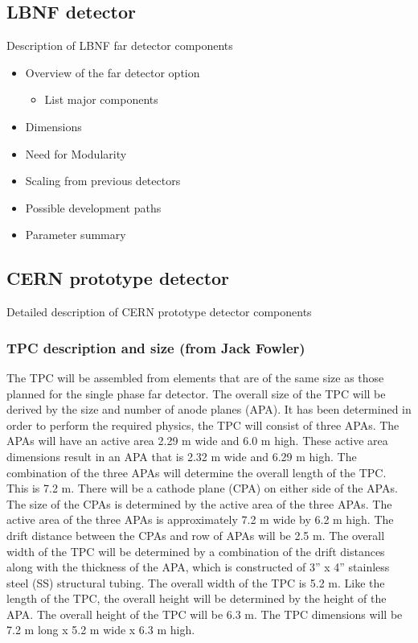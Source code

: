 \subsection{LBNF detector}
Description of LBNF far detector components
\begin{itemize}
\item Overview of the far detector option
\begin{itemize}
\item List major components
\end{itemize}
\item Dimensions
\item Need for Modularity
\item Scaling from previous detectors
\item Possible development paths
\item Parameter summary
\end{itemize}


\subsection{CERN prototype detector}
Detailed description of CERN prototype detector components
\subsubsection{TPC description and size (from Jack Fowler)}

The TPC will be assembled from elements that are of the same size as those planned for the single phase 
far detector.  The overall size of the TPC will be derived by the size and number of anode planes (APA).  It 
has been determined in order to perform the required physics, the TPC will consist of three APAs.  The 
APAs will have an active area 2.29 m wide and 6.0 m high.  These active area dimensions result in an APA 
that is 2.32 m wide and 6.29 m high.  The combination of the three APAs will determine the overall length 
of the TPC.  This is 7.2 m.  There will be a cathode plane (CPA) on either side of the APAs.  The size of the 
CPAs is determined by the active area of the three APAs.  The active area of the three APAs is 
approximately 7.2 m wide by 6.2 m high.  The drift distance between the CPAs and row of APAs will be 2.5 
m.  The overall width of the TPC will be determined by a combination of the drift distances along with the 
thickness of the APA, which is constructed of 3” x 4” stainless steel (SS) structural tubing.  The overall 
width of the TPC is 5.2 m.  Like the length of the TPC, the overall height will be determined by the height 
of the APA.  The overall height of the TPC will be 6.3 m.  The TPC dimensions will be 7.2 m long x 5.2 m 
wide x 6.3 m high.

